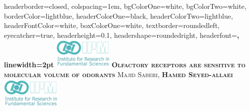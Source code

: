 \documentclass[landscape,a1paper,fontscale=0.6]{baposter} %
\begin{document}
\begin{poster}
{
headerborder=closed, %
colspacing=1em, %
bgColorOne=white, %
bgColorTwo=white, %
borderColor=lightblue, %
headerColorOne=black, %
headerColorTwo=lightblue, %
headerFontColor=white, %
boxColorOne=white, %
textborder=roundedleft, %
eyecatcher=true, %
headerheight=0.1\textheight, %
headershape=roundedright, %
headerfont=\Large\bf\textsc, %
linewidth=2pt %
}
%
{\includegraphics[height=4em]{fig/logo.jpg}} %
{\bf\textsc{Olfactory receptors are sensitive to molecular volume of odorants}\vspace{0.5em}} %
{\textsc{ Majid Saberi, \bf{Hamed Seyed-allaei} \vspace{0.5em} }}
{\includegraphics[height=4em]{fig/logo.jpg}} %




\end{poster}
\end{document}
